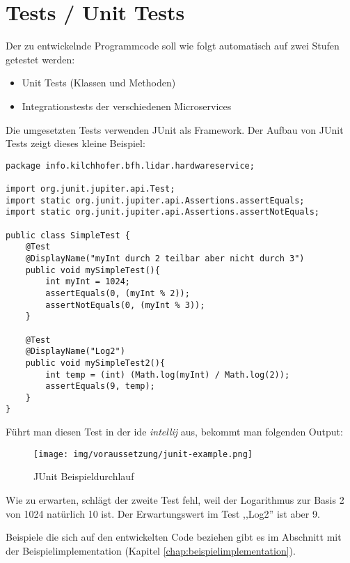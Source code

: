 \section{Tests / Unit Tests}
Der zu entwickelnde Programmcode soll wie folgt automatisch auf zwei Stufen getestet werden:
\begin{itemize}
	\item Unit Tests (Klassen und Methoden)
	\item Integrationstests der verschiedenen Microservices
\end{itemize}
Die umgesetzten Tests verwenden JUnit als Framework.  Der Aufbau von JUnit Tests zeigt dieses kleine Beispiel:
\begin{lstlisting}[caption={Simples Beispiel wie JUnit funktioniert},label={lst:junit-example-simple}]
package info.kilchhofer.bfh.lidar.hardwareservice;

import org.junit.jupiter.api.Test;
import static org.junit.jupiter.api.Assertions.assertEquals;
import static org.junit.jupiter.api.Assertions.assertNotEquals;

public class SimpleTest {
	@Test
	@DisplayName("myInt durch 2 teilbar aber nicht durch 3")
	public void mySimpleTest(){
		int myInt = 1024;
		assertEquals(0, (myInt % 2));
		assertNotEquals(0, (myInt % 3));
	}
	
	@Test
	@DisplayName("Log2")
	public void mySimpleTest2(){
		int temp = (int) (Math.log(myInt) / Math.log(2));
		assertEquals(9, temp);
	}
}
\end{lstlisting}
Führt man diesen Test in der \acrshort{ide} \textit{\Gls{intellij}} aus, bekommt man folgenden Output:
\begin{figure}[H]
	\centering
	\texttt{[image: img/voraussetzung/junit-example.png]}
	\caption{JUnit Beispieldurchlauf}
	\label{fig:junit-example}
\end{figure}
Wie zu erwarten, schlägt der zweite Test fehl, weil der Logarithmus zur Basis 2 von 1024 natürlich 10 ist. Der Erwartungswert im Test ,,Log2'' ist aber 9.

Beispiele die sich auf den entwickelten Code beziehen gibt es im Abschnitt mit der Beispielimplementation (Kapitel \ref{chap:beispielimplementation}).

